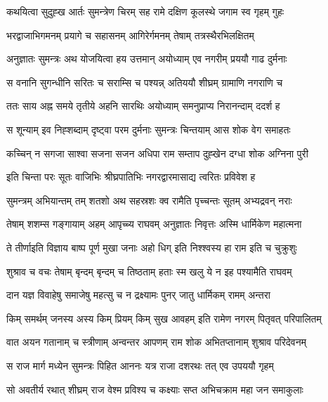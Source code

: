 
\twolineshloka
{कथयित्वा सुदुह्ख आर्तः सुमन्त्रेण चिरम् सह}
{रामे दक्षिण कूलस्थे जगाम स्व गृहम् गुहः} %

\twolineshloka
{भरद्वाजाभिगमनम् प्रयागे च सहासनम्}
{आगिरेर्गमनम् तेषाम् तत्रस्थैरभिलक्षितम्} %

\twolineshloka
{अनुज्ञातः सुमन्त्रः अथ योजयित्वा हय उत्तमान्}
{अयोध्याम् एव नगरीम् प्रययौ गाढ दुर्मनाः} %

\twolineshloka
{स वनानि सुगन्धीनि सरितः च सराम्सि च}
{पश्यन्न् अतिययौ शीघ्रम् ग्रामाणि नगराणि च} %

\twolineshloka
{ततः साय अह्न समये तृतीये अहनि सारथिः}
{अयोध्याम् समनुप्राप्य निरानन्दाम् ददर्श ह} %

\twolineshloka
{स शून्याम् इव निह्शब्दाम् दृष्ट्वा परम दुर्मनाः}
{सुमन्त्रः चिन्तयाम् आस शोक वेग समाहतः} %

\twolineshloka
{कच्चिन् न सगजा साश्वा सजना सजन अधिपा}
{राम सम्ताप दुह्खेन दग्धा शोक अग्निना पुरी} %

\twolineshloka
{इति चिन्ता परः सूतः वाजिभिः श्रीघ्रपातिभिः}
{नगरद्वारमासाद्य त्वरितः प्रविवेश ह} %

\twolineshloka
{सुमन्त्रम् अभियान्तम् तम् शतशो अथ सहस्रशः}
{क्व रामैति पृच्चन्तः सूतम् अभ्यद्रवन् नराः} %

\twolineshloka
{तेषाम् शशम्स गङ्गायाम् अहम् आपृच्च्य राघवम्}
{अनुज्ञातः निवृत्तः अस्मि धार्मिकेण महात्मना} %

\twolineshloka
{ते तीर्णाइति विज्ञाय बाष्प पूर्ण मुखा जनाः}
{अहो धिग् इति निश्श्वस्य हा राम इति च चुक्रुशुः} %

\twolineshloka
{शुश्राव च वचः तेषाम् बृन्दम् बृन्दम् च तिष्ठताम्}
{हताः स्म खलु ये न इह पश्यामैति राघवम्} %

\twolineshloka
{दान यज्ञ विवाहेषु समाजेषु महत्सु च}
{न द्रक्ष्यामः पुनर् जातु धार्मिकम् रामम् अन्तरा} %

\twolineshloka
{किम् समर्थम् जनस्य अस्य किम् प्रियम् किम् सुख आवहम्}
{इति रामेण नगरम् पितृवत् परिपालितम्} %

\twolineshloka
{वात अयन गतानाम् च स्त्रीणाम् अन्वन्तर आपणम्}
{राम शोक अभितप्तानाम् शुश्राव परिदेवनम्} %

\twolineshloka
{स राज मार्ग मध्येन सुमन्त्रः पिहित आननः}
{यत्र राजा दशरथः तत् एव उपययौ गृहम्} %

\twolineshloka
{सो अवतीर्य रथात् शीघ्रम् राज वेश्म प्रविश्य च}
{कक्ष्याः सप्त अभिचक्राम महा जन समाकुलाः} %

